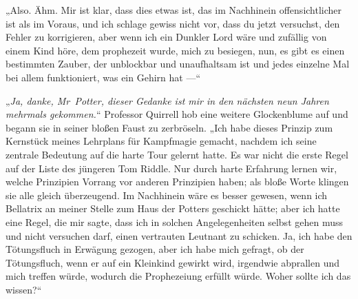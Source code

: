 „Also. Ähm. Mir ist klar, dass dies etwas ist, das im Nachhinein offensichtlicher ist als im Voraus, und ich schlage gewiss nicht vor, dass du jetzt versuchst, den Fehler zu korrigieren, aber wenn ich ein Dunkler Lord wäre und zufällig von einem Kind höre, dem prophezeit wurde, mich zu besiegen, nun, es gibt es einen bestimmten Zauber, der unblockbar und unaufhaltsam ist und jedes einzelne Mal bei allem funktioniert, was ein Gehirn hat —“

„\emph{Ja, danke, Mr~Potter, dieser Gedanke ist mir in den nächsten neun Jahren mehrmals gekommen.}“
Professor Quirrell hob eine weitere Glockenblume auf und begann sie in seiner bloßen Faust zu zerbröseln.
„Ich habe dieses Prinzip zum Kernstück meines Lehrplans für Kampfmagie gemacht, nachdem ich seine zentrale Bedeutung auf die harte Tour gelernt hatte. Es war nicht die erste Regel auf der Liste des jüngeren Tom Riddle. Nur durch harte Erfahrung lernen wir, welche Prinzipien Vorrang vor anderen Prinzipien haben; als bloße Worte klingen sie alle gleich überzeugend. Im Nachhinein wäre es besser gewesen, wenn ich Bellatrix an meiner Stelle zum Haus der Potters geschickt hätte; aber ich hatte eine Regel, die mir sagte, dass ich in solchen Angelegenheiten selbst gehen muss und nicht versuchen darf, einen vertrauten Leutnant zu schicken. Ja, ich habe den Tötungsfluch in Erwägung gezogen, aber ich habe mich gefragt, ob der Tötungsfluch, wenn er auf ein Kleinkind gewirkt wird, irgendwie abprallen und mich treffen würde, wodurch die Prophezeiung erfüllt würde. Woher sollte ich das wissen?“

